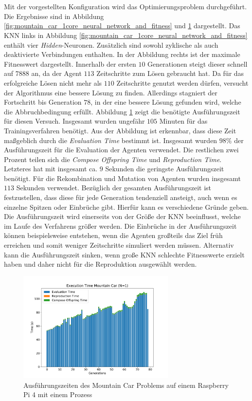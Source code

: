 \\\\
Mit der vorgestellten Konfiguration wird das Optimierungsproblem durchgeführt. Die Ergebnisse sind in Abbildung \ref{fig:mountain_car_1core_neural_network_and_fitness} und \ref{fig:mountain_car_time_single_core} dargestellt. Das \ac{KNN} links in Abbildung \ref{fig:mountain_car_1core_neural_network_and_fitness} enthält vier \emph{Hidden}-Neuronen. Zusätzlich sind sowohl zyklische als auch deaktivierte Verbindungen enthalten. In der Abbildung rechts ist der maximale Fitnesswert dargestellt. Innerhalb der ersten $10$ Generationen steigt dieser schnell auf $7888$ an, da der Agent $113$ Zeitschritte zum Lösen gebraucht hat. Da für das erfolgreiche Lösen nicht mehr als $110$ Zeitschritte genutzt werden dürfen, versucht der Algorithmus eine bessere Lösung zu finden. Allerdings stagniert der Fortschritt bis Generation $78$, in der eine bessere Lösung gefunden wird, welche die Abbruchbedingung erfüllt. Abbildung \ref{fig:mountain_car_time_single_core} zeigt die benötigte Ausführungszeit für diesen Versuch. Insgesamt wurden ungefähr $105$ Minuten für das Trainingsverfahren benötigt. Aus der Abbildung ist erkennbar, dass diese Zeit maßgeblich durch die \emph{Evaluation Time} bestimmt ist. Insgesamt wurden $98\%$ der Ausführungszeit für die Evaluation der Agenten verwendet. Die restlichen zwei Prozent teilen sich die \emph{Compose Offspring Time} und \emph{Reproduction Time}. Letzteres hat mit insgesamt ca. $9$ Sekunden die geringste Ausführungszeit benötigt. Für die Rekombination und Mutation von Agenten wurden insgesamt $113$ Sekunden verwendet. Bezüglich der gesamten Ausführungszeit ist festzustellen, dass diese für jede Generation tendenziell ansteigt, auch wenn es einzelne Spitzen oder Einbrüche gibt. Hierfür kann es verschiedene Gründe geben. Die Ausführungszeit wird einerseits von der Größe der \ac{KNN} beeinflusst, welche im Laufe des Verfahrens größer werden. Die Einbrüche in der Ausführungszeit können beispielsweise entstehen, wenn die Agenten großteils das Ziel früh erreichen und somit weniger Zeitschritte simuliert werden müssen. Alternativ kann die Ausführungszeit sinken, wenn große \ac{KNN} schlechte Fitnesswerte erzielt haben und daher nicht für die Reproduktion ausgewählt werden.  
\begin{figure}[!h]
	\centering
	\includegraphics[width=0.7\textwidth]{./img/mountain_car_single/1413_time_1core_1pi.pdf} 
	\caption{Ausführungszeiten des Mountain Car Problems auf einem Raspberry Pi 4 mit einem Prozess}
	\label{fig:mountain_car_time_single_core}
\end{figure}

